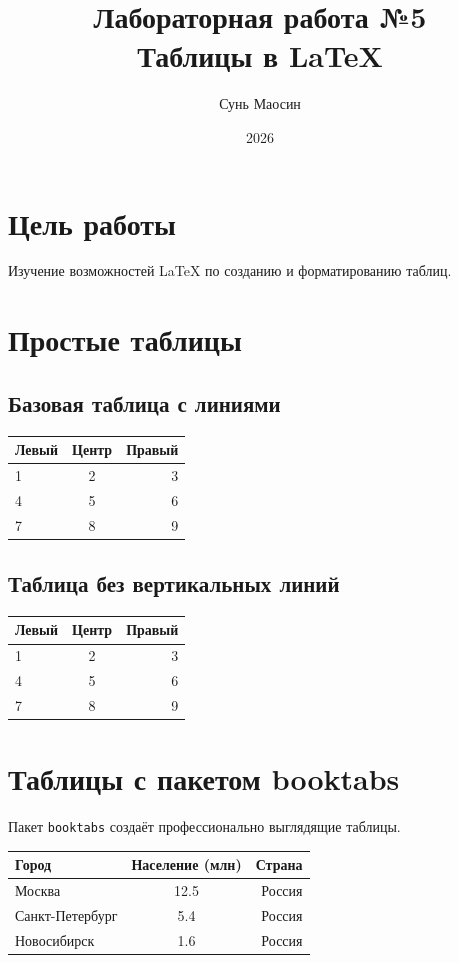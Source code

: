 \documentclass[a4paper,12pt]{article}
\title{Лабораторная работа №5 \\ Таблицы в LaTeX}
\author{Сунь Маосин}
\date{2026}
\begin{document}
\maketitle

\section{Цель работы}

Изучение возможностей LaTeX по созданию и форматированию таблиц.

\section{Простые таблицы}

\subsection{Базовая таблица с линиями}

\begin{tabular}{|l|c|r|}
  \hline
  Левый & Центр & Правый \\
  \hline
  1 & 2 & 3 \\
  \hline
  4 & 5 & 6 \\
  \hline
  7 & 8 & 9 \\
  \hline
\end{tabular}

\subsection{Таблица без вертикальных линий}

\begin{tabular}{lcr}
  \hline
  Левый & Центр & Правый \\
  \hline
  1 & 2 & 3 \\
  4 & 5 & 6 \\
  7 & 8 & 9 \\
  \hline
\end{tabular}

\section{Таблицы с пакетом booktabs}

Пакет \texttt{booktabs} создаёт профессионально выглядящие таблицы.

\begin{tabular}{lcr}
  \toprule
  Город & Население (млн) & Страна \\
  \midrule
  Москва & 12.5 & Россия \\
  Санкт-Петербург & 5.4 & Россия \\
  Новосибирск & 1.6 & Россия \\
  \bottomrule
\end{tabular}
\end{document}
